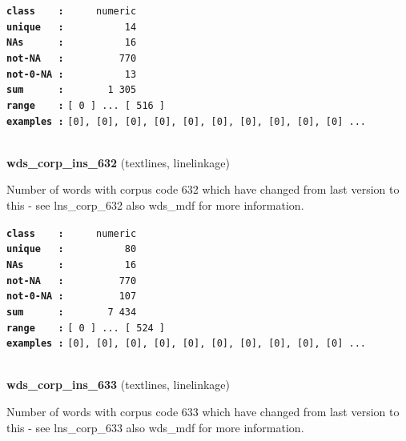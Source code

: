 \documentclass[]{article}
\begin{document}
\textbf{\texttt{class\ \ \ \ :}} \texttt{~~~~~numeric}\\
\textbf{\texttt{unique\ \ \ :}} \texttt{~~~~~~~~~~14}\\
\textbf{\texttt{NAs\ \ \ \ \ \ :}} \texttt{~~~~~~~~~~16}\\
\textbf{\texttt{not-NA\ \ \ :}} \texttt{~~~~~~~~~770}\\
\textbf{\texttt{not-0-NA\ :}} \texttt{~~~~~~~~~~13}\\
\textbf{\texttt{sum\ \ \ \ \ \ :}} \texttt{~~~~~~~1~305}\\
\textbf{\texttt{range\ \ \ \ :}}
\texttt{{[}\ 0\ {]}\ ...\ {[}\ 516\ {]}}\\
\textbf{\texttt{examples\ :}}
\texttt{{[}0{]},\ {[}0{]},\ {[}0{]},\ {[}0{]},\ {[}0{]},\ {[}0{]},\ {[}0{]},\ {[}0{]},\ {[}0{]},\ {[}0{]}\ ...}\\

~

\textbf{wds\_corp\_ins\_632} (textlines, linelinkage)

Number of words with corpus code 632 which have changed from last
version to this - see lns\_corp\_632 also wds\_mdf for more information.

\textbf{\texttt{class\ \ \ \ :}} \texttt{~~~~~numeric}\\
\textbf{\texttt{unique\ \ \ :}} \texttt{~~~~~~~~~~80}\\
\textbf{\texttt{NAs\ \ \ \ \ \ :}} \texttt{~~~~~~~~~~16}\\
\textbf{\texttt{not-NA\ \ \ :}} \texttt{~~~~~~~~~770}\\
\textbf{\texttt{not-0-NA\ :}} \texttt{~~~~~~~~~107}\\
\textbf{\texttt{sum\ \ \ \ \ \ :}} \texttt{~~~~~~~7~434}\\
\textbf{\texttt{range\ \ \ \ :}}
\texttt{{[}\ 0\ {]}\ ...\ {[}\ 524\ {]}}\\
\textbf{\texttt{examples\ :}}
\texttt{{[}0{]},\ {[}0{]},\ {[}0{]},\ {[}0{]},\ {[}0{]},\ {[}0{]},\ {[}0{]},\ {[}0{]},\ {[}0{]},\ {[}0{]}\ ...}\\

~

\textbf{wds\_corp\_ins\_633} (textlines, linelinkage)

Number of words with corpus code 633 which have changed from last
version to this - see lns\_corp\_633 also wds\_mdf for more information.
\end{document}
